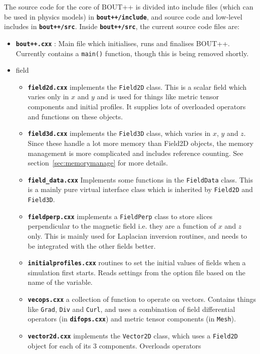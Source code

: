 \documentclass[12pt]{article}
\newcommand{\code}[1]{\texttt{#1}}
\newcommand{\file}[1]{\texttt{\bf #1}}
\begin{document}
The source code for the core of BOUT++ is divided into
include files (which can be used in physics models) in 
\file{bout++/include}, and source code and low-level includes
in \file{bout++/src}. Inside \file{bout++/src}, the current source code
files are:
\begin{itemize}
\item \file{bout++.cxx} : Main file which initialises, runs and finalises
  BOUT++. Currently contains a \code{main()} function, though this is
  being removed shortly.
\item field
  \begin{itemize}
  \item {} \file{field2d.cxx} implements the \code{Field2D} class. This is a
    scalar field which varies only in $x$ and $y$ and is used for things
    like metric tensor components and initial profiles. It supplies lots
    of overloaded operators and functions on these objects.
  \item \file{field3d.cxx} implements the \code{Field3D} class, which varies 
    in $x$, $y$ and $z$. Since these handle a lot more memory than Field2D
    objects, the memory management is more complicated and includes reference
    counting. See section~\ref{sec:memorymanage} for more details.
  \item \file{field\_data.cxx} Implements some functions in the \code{FieldData} class. This is a mainly pure virtual interface class which is inherited by \code{Field2D} and \code{Field3D}.
  \item \file{fieldperp.cxx} implements a \code{FieldPerp} class to store
    slices perpendicular to the magnetic field i.e. they are a function of
    $x$ and $z$ only. This is mainly used for Laplacian inversion routines,
    and needs to be integrated with the other fields better.
  \item \file{initialprofiles.cxx} routines to set the initial values of
    fields when a simulation first starts. Reads settings from the option
    file based on the name of the variable.
  \item \file{vecops.cxx} a collection of function to operate on vectors. 
    Contains things like \code{Grad}, \code{Div} and \code{Curl}, and uses
    a combination of field differential operators (in \file{difops.cxx}) and
    metric tensor components (in \code{Mesh}).
  \item \file{vector2d.cxx} implements the \code{Vector2D} class, which uses
    a \code{Field2D} object for each of its 3 components. Overloads operators 

\end{itemize}
\end{itemize}
\end{document}
